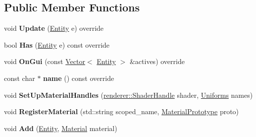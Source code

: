 \subsection*{Public Member Functions}
\begin{DoxyCompactItemize}
\item 
\mbox{\label{classnabla_1_1_matrial_systerm_a652fe36f309e55f23eb8e07472687142}} 
void {\bfseries Update} (\mbox{\hyperlink{structnabla_1_1_entity}{Entity}} e) override
\item 
\mbox{\label{classnabla_1_1_matrial_systerm_a0cf78a10d4da9c4bf1fc1ad9521303c1}} 
bool {\bfseries Has} (\mbox{\hyperlink{structnabla_1_1_entity}{Entity}} e) const override
\item 
\mbox{\label{classnabla_1_1_matrial_systerm_abc5dc7a56029b088bc0957159008582d}} 
void {\bfseries On\+Gui} (const \mbox{\hyperlink{classnabla_1_1_s_t_l_vector_ex}{Vector}}$<$ \mbox{\hyperlink{structnabla_1_1_entity}{Entity}} $>$ \&actives) override
\item 
\mbox{\label{classnabla_1_1_matrial_systerm_a935893db7737571b9c718c80ce9c8479}} 
const char $\ast$ {\bfseries name} () const override
\item 
\mbox{\label{classnabla_1_1_matrial_systerm_a05b373779c473979ec124e712024c099}} 
void {\bfseries Set\+Up\+Material\+Handles} (\mbox{\hyperlink{classnabla_1_1renderer_1_1_handle}{renderer\+::\+Shader\+Handle}} shader, \mbox{\hyperlink{structnabla_1_1_matrial_systerm_1_1_uniforms}{Uniforms}} names)
\item 
\mbox{\label{classnabla_1_1_matrial_systerm_a3ab0c89f3a800e30f3593325a57cf704}} 
void {\bfseries Register\+Material} (std\+::string scoped\+\_\+name, \mbox{\hyperlink{structnabla_1_1_matrial_systerm_1_1_material_prototype}{Material\+Prototype}} proto)
\item 
\mbox{\label{classnabla_1_1_matrial_systerm_aca1557c2a74647d7e1c077e9549cc6e7}} 
void {\bfseries Add} (\mbox{\hyperlink{structnabla_1_1_entity}{Entity}}, \mbox{\hyperlink{structnabla_1_1_matrial_systerm_1_1_material}{Material}} material)

\end{DoxyCompactItemize}
